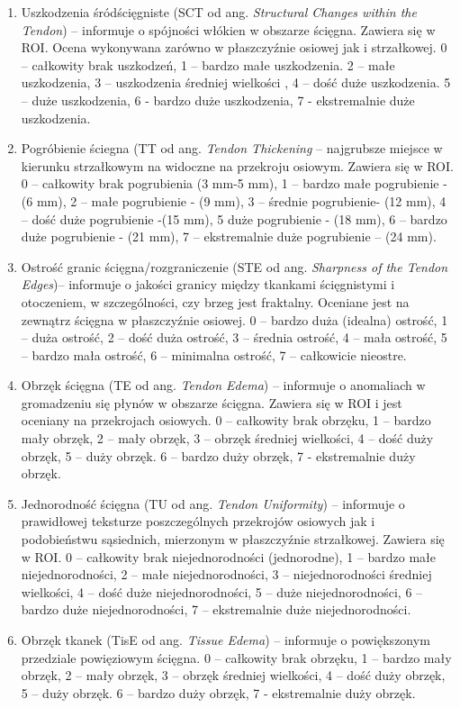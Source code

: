 \begin{enumerate}
	\item Uszkodzenia śródścięgniste (SCT od ang. \textit{Structural Changes within the Tendon}) -- informuje o spójności włókien w obszarze ścięgna. Zawiera się w ROI. Ocena wykonywana zarówno w płaszczyźnie osiowej jak i strzałkowej. 0 – całkowity brak uszkodzeń, 1 – bardzo małe uszkodzenia. 2 – małe uszkodzenia, 3 – uszkodzenia średniej wielkości , 4 – dość duże uszkodzenia. 5 – duże uszkodzenia, 6 - bardzo duże uszkodzenia, 7 - ekstremalnie duże uszkodzenia.
	\item Pogróbienie ściegna (TT od ang. \textit{Tendon Thickening} -- najgrubsze miejsce w kierunku strzałkowym na widoczne na przekroju osiowym. Zawiera się w ROI. 0 – całkowity brak pogrubienia (3 mm-5 mm), 1 – bardzo małe pogrubienie - (6 mm), 2 – małe pogrubienie - (9 mm), 3 – średnie pogrubienie- (12 mm), 4 –  dość duże pogrubienie -(15 mm), 5 duże pogrubienie - (18 mm), 6 – bardzo duże pogrubienie - (21 mm), 7 – ekstremalnie duże pogrubienie – (24 mm).
	\item Ostrość granic ścięgna/rozgraniczenie (STE od ang. \textit{Sharpness of the Tendon Edges})-- informuje o jakości granicy między tkankami ścięgnistymi i otoczeniem, w szczególności, czy brzeg jest fraktalny. Oceniane jest na zewnątrz ścięgna w płaszczyźnie osiowej. 0 – bardzo duża (idealna) ostrość, 1 – duża ostrość, 2 – dość duża ostrość, 3 – średnia ostrość, 4 – mała ostrość, 5 – bardzo mała ostrość, 6 – minimalna ostrość, 7 – całkowicie nieostre.
	\item Obrzęk ścięgna (TE od ang. \textit{Tendon Edema}) -- informuje o anomaliach w gromadzeniu się płynów w obszarze ścięgna. Zawiera się w ROI i jest oceniany na przekrojach osiowych. 0 – całkowity brak obrzęku, 1 – bardzo mały obrzęk, 2 – mały obrzęk, 3 – obrzęk średniej wielkości, 4 – dość duży obrzęk, 5 – duży obrzęk. 6 – bardzo duży obrzęk, 7 - ekstremalnie duży obrzęk.
	\item Jednorodność ścięgna (TU od ang. \textit{Tendon Uniformity}) -- informuje o prawidłowej teksturze poszczególnych przekrojów osiowych jak i podobieństwu sąsiednich, mierzonym w płaszczyźnie strzałkowej. Zawiera się w ROI. 0 – całkowity brak niejednorodności (jednorodne), 1 – bardzo małe niejednorodności, 2 – małe niejednorodności, 3 – niejednorodności średniej wielkości, 4 – dość duże niejednorodności, 5 – duże niejednorodności, 6 – bardzo duże niejednorodności, 7 –  ekstremalnie duże niejednorodności. 
	\item Obrzęk tkanek (TisE od ang. \textit{Tissue Edema}) -- informuje o powiększonym przedziale powięziowym ścięgna. 0  – całkowity brak obrzęku, 1 – bardzo mały obrzęk, 2 – mały obrzęk, 3 – obrzęk średniej wielkości, 4 – dość duży obrzęk, 5 – duży obrzęk. 6 – bardzo duży obrzęk, 7 - ekstremalnie duży obrzęk.
\end{enumerate}

